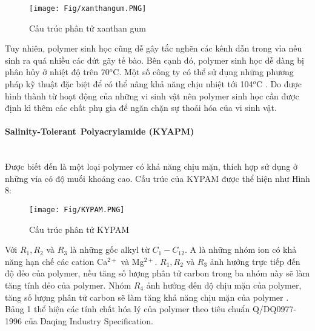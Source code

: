 \documentclass[12pt,a4paper]{article}
\newcommand{\subsubsubsection}[1]{\paragraph{#1}\mbox{}\\}
\begin{document}
	\begin{figure}[h]
		\centering
		\texttt{[image: Fig/xanthangum.PNG]}
		\caption{Cấu trúc phân tử xanthan gum \cite{sheng2010modern}}
	\end{figure}
	\newline
	Tuy nhiên, polymer sinh học cũng dễ gây tắc nghẽn các kênh dẫn trong vỉa nếu sinh ra quá nhiều các đứt gãy tế bào. Bên cạnh đó, polymer sinh học dễ dàng bị phân hủy ở nhiệt độ trên 70$^o$C. Một số công ty có thể sử dụng những phương pháp kỹ thuật đặc biệt để có thể nâng khả năng chịu nhiệt tới 104$^o$C \cite{sheng2010modern}. Do được hình thành từ hoạt động của những vi sinh vật nên polymer sinh học cần được định kì thêm các chất phụ gia để ngăn chặn sự thoái hóa của vi sinh vật.
	\newpage
	\subsubsubsection{Salinity-Tolerant Polyacrylamide (KYAPM)}
	Được biết đến là một loại polymer có khả năng chịu mặn, thích hợp sử dụng ở những vỉa có độ muối khoáng cao. Cấu trúc của KYPAM được thể hiện như Hình 8:
	\begin{figure}[h]
		\centering
		\texttt{[image: Fig/KYPAM.PNG]}
		\caption{Cấu trúc phân tử KYPAM \cite{sheng2010modern}}
	\end{figure}
	\newline
	Với $R_1, R_2$ và $R_3$ là những gốc alkyl từ $C_1 - C_{12}$. A là những nhóm ion có khả năng hạn chế các cation Ca$^{2+}$ và Mg$^{2+}$. $R_1, R_2$ và $R_3$ ảnh hưởng trực tiếp đến độ dẻo của polymer, nếu tăng số lượng phân tử carbon trong ba nhóm này sẽ làm tăng tính dẻo của polymer. Nhóm $R_4$ ảnh hưởng đến độ chịu mặn của polymer, tăng số lượng phân tử carbon sẽ làm tăng khả năng chịu mặn của polymer \cite{sheng2010modern}. 
	\noindent
	Bảng 1 thể hiện các tính chất hóa lý của polymer theo tiêu chuẩn Q/DQ0977-1996 của Daqing Industry Specification.
\end{document}
